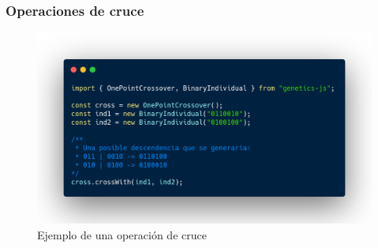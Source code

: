 \documentclass{beamer}
\begin{document}
\begin{frame}
\frametitle{Operaciones de cruce}

\begin{figure}
    \centering
    \includegraphics[scale=0.23]{pres/img/desarrollo/crossover-example.png}
    \caption{Ejemplo de una operación de cruce}
    \label{fig:my_label}
\end{figure}

\end{frame}
\end{document}
